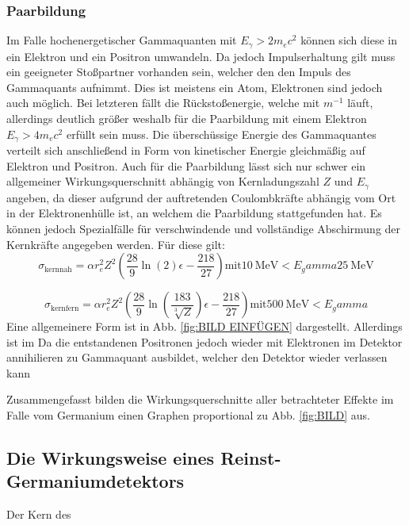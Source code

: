 \subsubsection{Paarbildung}
Im Falle hochenergetischer Gammaquanten mit $E_\gamma > 2 m_e c^2$ können sich diese in ein Elektron und ein Positron umwandeln. Da jedoch Impulserhaltung gilt muss ein geeigneter Stoßpartner vorhanden sein, welcher den den Impuls des Gammaquants aufnimmt. Dies ist meistens ein Atom, Elektronen sind jedoch auch möglich. Bei letzteren fällt die Rückstoßenergie, welche mit $m^{-1}$ läuft, allerdings deutlich größer weshalb für die Paarbildung mit einem Elektron $E_\gamma > 4 m_e c^2$ erfüllt sein muss. Die überschüssige Energie des Gammaquantes verteilt sich anschließend in Form von kinetischer Energie gleichmäßig auf Elektron und Positron. Auch für die Paarbildung lässt sich nur schwer ein allgemeiner Wirkungsquerschnitt abhängig von Kernladungszahl $Z$ und $E_\gamma$ angeben, da dieser aufgrund der auftretenden Coulombkräfte abhängig vom Ort in der Elektronenhülle ist, an welchem die Paarbildung stattgefunden hat. Es können jedoch Spezialfälle für verschwindende und vollständige Abschirmung der Kernkräfte angegeben werden. Für diese gilt:
\begin{equation}
    \sigma_\text{kernnah} = \alpha r_e^2 Z^2 \left( \frac{28}{9}\ln(2) \epsilon - \frac{218}{27}\right) \text{mit} \SI{10}{\mega\electronvolt} < E_gamma \SI{25}{\mega\electronvolt}
\end{equation}

\begin{equation}
    \sigma_\text{kernfern} = \alpha r_e^2 Z^2 \left( \frac{28}{9}\ln\left(\frac{183}{\sqrt[3]{Z}}\right) \epsilon - \frac{218}{27}\right) \text{mit} \SI{500}{\mega\electronvolt} < E_gamma
\end{equation}
Eine allgemeinere Form ist in Abb. \ref{fig:BILD EINFÜGEN} dargestellt.
Allerdings ist im 
Da die entstandenen Positronen jedoch wieder mit Elektronen im Detektor annihilieren zu  Gammaquant ausbildet, welcher den Detektor wieder verlassen kann


Zusammengefasst bilden die Wirkungsquerschnitte aller betrachteter Effekte im Falle vom Germanium einen Graphen proportional zu Abb. \ref{fig:BILD} aus. %



\subsection{Die Wirkungsweise eines Reinst-Germaniumdetektors}
Der Kern des 